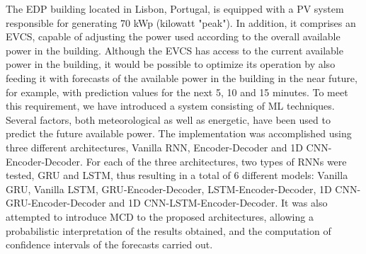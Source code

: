 \noindent The \ac{EDP} building located in Lisbon, Portugal, is equipped with a \ac{PV} system responsible for generating 70 kWp (kilowatt "peak"). In addition, it comprises an \ac{EVCS}, capable of adjusting the power used according to the overall available power in the building. Although the \ac{EVCS} has access to the current available power in the building, it would be possible to optimize its operation by also feeding it with forecasts of the available power in the building in the near future, for example, with prediction values for the next 5, 10 and 15 minutes. To meet this requirement, we have introduced a system consisting of \ac{ML} techniques. Several factors, both meteorological as well as energetic, have been used to predict the future available power. The implementation was accomplished using three different architectures, Vanilla \ac{RNN}, Encoder-Decoder and \ac{1D CNN}-Encoder-Decoder. For each of the three architectures, two types of \ac{RNN}s were tested, \ac{GRU} and \ac{LSTM}, thus resulting in a total of 6 different models: Vanilla \ac{GRU}, Vanilla \ac{LSTM}, \ac{GRU}-Encoder-Decoder, \ac{LSTM}-Encoder-Decoder, \ac{1D CNN}-\ac{GRU}-Encoder-Decoder and \ac{1D CNN}-\ac{LSTM}-Encoder-Decoder. It was also attempted to introduce \ac{MCD} to the proposed architectures, allowing a probabilistic interpretation of the results obtained, and the computation of confidence intervals of the forecasts carried out. 
